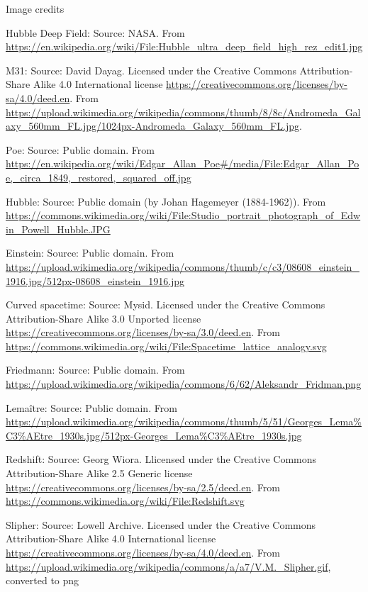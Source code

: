 \documentclass[usenames,dvipsnames,12pt,compress]{beamer}
\begin{document}
\begin{frame}{Image credits}
  \begin{enumerate}
  \tiny {
  \item{Hubble Deep Field: Source: NASA. From \url{https://en.wikipedia.org/wiki/File:Hubble_ultra_deep_field_high_rez_edit1.jpg}}
  \item{M31: Source: David Dayag. Licensed under the Creative Commons Attribution-Share Alike 4.0 International license \url{https://creativecommons.org/licenses/by-sa/4.0/deed.en}. From \url{https://upload.wikimedia.org/wikipedia/commons/thumb/8/8c/Andromeda_Galaxy_560mm_FL.jpg/1024px-Andromeda_Galaxy_560mm_FL.jpg}.}
  \item{Poe: Source: Public domain. From \url{https://en.wikipedia.org/wiki/Edgar_Allan_Poe\#/media/File:Edgar_Allan_Poe,_circa_1849,_restored,_squared_off.jpg}}
  \item{Hubble: Source: Public domain (by Johan Hagemeyer (1884-1962)). From \url{https://commons.wikimedia.org/wiki/File:Studio_portrait_photograph_of_Edwin_Powell_Hubble.JPG}}
  \item{Einstein: Source: Public domain. From \url{https://upload.wikimedia.org/wikipedia/commons/thumb/c/c3/08608_einstein_1916.jpg/512px-08608_einstein_1916.jpg}}
  \item{Curved spacetime: Source: Mysid. Licensed under the Creative Commons Attribution-Share Alike 3.0 Unported license \url{https://creativecommons.org/licenses/by-sa/3.0/deed.en}. From \url{https://commons.wikimedia.org/wiki/File:Spacetime_lattice_analogy.svg}}
  \item{Friedmann: Source: Public domain. From \url{https://upload.wikimedia.org/wikipedia/commons/6/62/Aleksandr_Fridman.png}}
  \item{Lema\^itre: Source: Public domain. From \url{https://upload.wikimedia.org/wikipedia/commons/thumb/5/51/Georges_Lema\%C3\%AEtre_1930s.jpg/512px-Georges_Lema\%C3\%AEtre_1930s.jpg}}  
  \item{Redshift: Source: Georg Wiora. Llicensed under the Creative Commons Attribution-Share Alike 2.5 Generic license \url{https://creativecommons.org/licenses/by-sa/2.5/deed.en}. From \url{https://commons.wikimedia.org/wiki/File:Redshift.svg}}
  \item{Slipher: Source: Lowell Archive. Licensed under the Creative Commons Attribution-Share Alike 4.0 International license \url{https://creativecommons.org/licenses/by-sa/4.0/deed.en}. From \url{https://upload.wikimedia.org/wikipedia/commons/a/a7/V.M._Slipher.gif}, converted to png}  
  } %
  \end{enumerate}
\end{frame}
\end{document}
